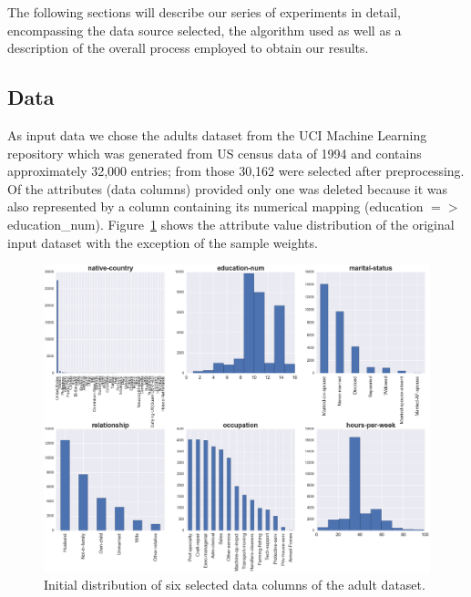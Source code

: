 \documentclass{llncs}
\begin{document}
The following sections will describe our series of experiments in detail, encompassing the data source selected, the algorithm used as well as a description of the overall process employed to obtain our results.


\subsection{Data} 
\label{ssect:data}

As input data we chose the adults dataset from the UCI Machine Learning repository which was generated from US census data of 1994 and contains approximately 32,000 entries; from those 30,162 were selected after preprocessing. Of the attributes (data columns) provided only one was deleted because it was also represented by a column containing its numerical mapping (education $=>$ education\_num). Figure~\ref{fig:adult_original_distribution} shows the attribute value distribution of the original input dataset with the exception of the sample weights.


\begin{figure}[!t]
	\begin{center}
    \hspace*{-0.8cm}
		\includegraphics[width=1.1\textwidth]{figures/experiment/dist_initial_small}
		\caption{Initial distribution of six selected data columns of the adult dataset.}
		\label{fig:adult_original_distribution}
	\end{center}
\end{figure}
\end{document}
